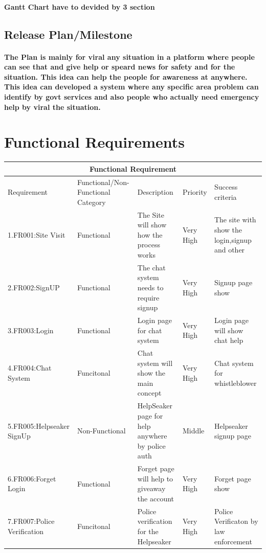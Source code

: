 \documentclass{article}
\begin{document}
\paragraph{Gantt Chart have to devided by 3 section}

\subsection{Release Plan/Milestone}
\paragraph{The Plan is mainly for viral any situation in a platform where people can see that and give help or speard news for safety and for the situation. This idea can help the people for awareness at anywhere. This idea can developed a system where any specific area problem can identify by govt services and also people who actually need emergency help by viral the situation. }



\newpage
\section{Functional Requirements}

\begin{tabular}{|p{3cm}||p{3cm}|p{4cm}|p{1cm}  |p{3cm}|  }
 \hline

 \multicolumn{5}{|c|}{Functional  Requirement} \\

 \hline
Requirement&Functional/Non-Functional Category & Description & Priority & Success criteria\\
 \hline
1.FR001:Site Visit  &Functional&The Site will show how the process works&Very High&The site with show the login,signup and other\\
\hline
2.FR002:SignUP&Functional&The chat system needs to require signup&Very High&Signup page show\\
\hline
 3.FR003:Login&Functional&Login page for chat system&Very High&Login page will show chat help\\
\hline
 4.FR004:Chat System&Funcitonal&Chat system will show the main concept&Very High&Chat system for whistleblower\\
\hline
5.FR005:Helpseaker SignUp &Non-Functional&HelpSeaker page for help anywhere by police auth&Middle&Helpseaker signup page \\
\hline
 6.FR006:Forget Login & Functional&Forget page will help to giveaway the account&Very High&Forget page show\\
\hline
7.FR007:Police Verification&Funcitonal&Police verification for the Helpseaker&Very High&Police Verificaton by law enforcement\\
 \hline
\end{tabular}
\end{document}
